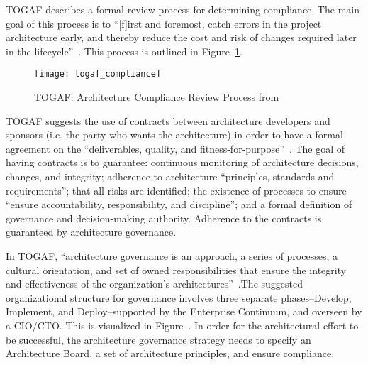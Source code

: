 TOGAF describes a formal review process for determining compliance. The main goal of this process is to ``[f]irst and foremost, catch errors in the project architecture early, and thereby reduce the cost and risk of changes required later in the lifecycle''~\cite[Ch. 48.3.1]{togaf9.1}. This process is outlined in Figure~\ref{fig:togaf_compliance}.

\begin{figure}
\centering
\texttt{[image: togaf\_compliance]}
\caption{TOGAF: Architecture Compliance Review Process from \cite[Sec. 48.4.1]{togaf9.1}}
\label{fig:togaf_compliance}
\end{figure}



TOGAF suggests the use of contracts between architecture developers and sponsors (i.e. the party who wants the architecture) in order to have a formal agreement on the ``deliverables, quality, and fitness-for-purpose''~\cite[Ch. 49]{togaf9.1}. The goal of having contracts is to guarantee: continuous monitoring of architecture decisions, changes, and integrity; adherence to architecture ``principles, standards and requirements''; that all risks are identified;  the existence of processes to ensure ``ensure accountability, responsibility, and discipline''; and a formal definition of governance and decision-making authority. Adherence to the contracts is guaranteed by architecture governance.

In TOGAF, ``architecture governance is an approach, a series of processes, a cultural orientation, and set of owned responsibilities that ensure the integrity and effectiveness of the organization's architectures''~\cite[Ch. 50]{togaf9.1}.The suggested organizational structure for governance involves three separate phases--Develop, Implement, and Deploy--supported by the Enterprise Continuum, and overseen by a CIO/CTO. This is visualized in Figure~\cite{togaf_govStructure}. In order for the architectural effort to be successful, the architecture governance strategy needs to specify an Architecture Board, a set of architecture principles, and ensure compliance. 


